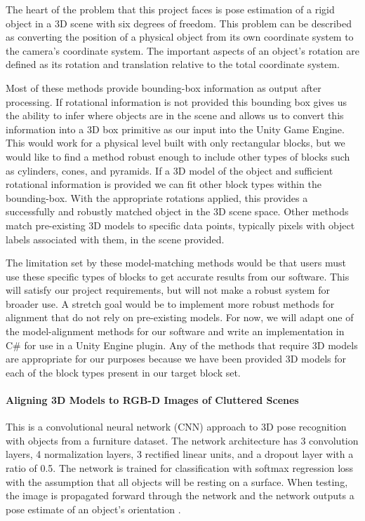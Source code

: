 \documentclass[12pt]{article}
\begin{document}
The heart of the problem that this project faces is pose estimation of a
rigid object in a 3D scene with six degrees of freedom. This problem can
be described as converting the position of a physical object from its
own coordinate system to the camera's coordinate system. The important
aspects of an object's rotation are defined as its rotation and
translation relative to the total coordinate system.

Most of these methods provide bounding-box information as output after
processing. If rotational information is not provided this bounding box
gives us the ability to infer where objects are in the scene and allows
us to convert this information into a 3D box primitive as our input into
the Unity Game Engine. This would work for a physical level built with
only rectangular blocks, but we would like to find a method robust
enough to include other types of blocks such as cylinders, cones, and
pyramids. If a 3D model of the object and sufficient rotational
information is provided we can fit other block types within the
bounding-box. With the appropriate rotations applied, this provides a
successfully and robustly matched object in the 3D scene space. Other
methods match pre-existing 3D models to specific data points, typically
pixels with object labels associated with them, in the scene provided.

The limitation set by these model-matching methods would be that users
must use these specific types of blocks to get accurate results from our
software. This will satisfy our project requirements, but will not make
a robust system for broader use. A stretch goal would be to implement
more robust methods for alignment that do not rely on pre-existing
models. For now, we will adapt one of the model-alignment methods for
our software and write an implementation in C\# for use in a Unity
Engine plugin. Any of the methods that require 3D models are appropriate
for our purposes because we have been provided 3D models for each of the
block types present in our target block set.

\paragraph{Aligning 3D Models to RGB-D Images of Cluttered
Scenes}\label{aligning-3d-models-to-rgb-d-images-of-cluttered-scenes}

This is a convolutional neural network (CNN) approach to 3D pose
recognition with objects from a furniture dataset. The network
architecture has 3 convolution layers, 4 normalization layers, 3
rectified linear units, and a dropout layer with a ratio of 0.5. The
network is trained for classification with softmax regression loss with
the assumption that all objects will be resting on a surface. When
testing, the image is propagated forward through the network and the
network outputs a pose estimate of an object's orientation
\autocite{gupta}.
\end{document}

